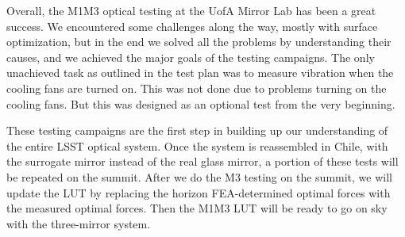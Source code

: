 \documentclass [twoside,openbib,12pt]{article}
\begin{document}
Overall, the M1M3 optical testing at the UofA Mirror Lab has been a
great success. We encountered some challenges along the way, mostly
with surface optimization, but in the end we solved all the problems
by understanding their causes, and we achieved the major goals of the
testing campaigns. The only unachieved task as outlined in the test
plan was to measure vibration when the cooling fans are turned
on. This was not done due to problems turning on the cooling fans. But
this was designed as an optional test from the very beginning.

These testing campaigns are the
first step in building up our understanding of the entire LSST optical system.
Once the system is reassembled in Chile, with the surrogate mirror
instead of the real glass mirror, a portion of these tests will be
repeated on the summit.
After we do the M3 testing on the summit, we will update the LUT by
replacing the horizon FEA-determined optimal forces with the measured
optimal forces. Then the M1M3 LUT will be ready to go on sky with the
three-mirror system.


\end{document}
